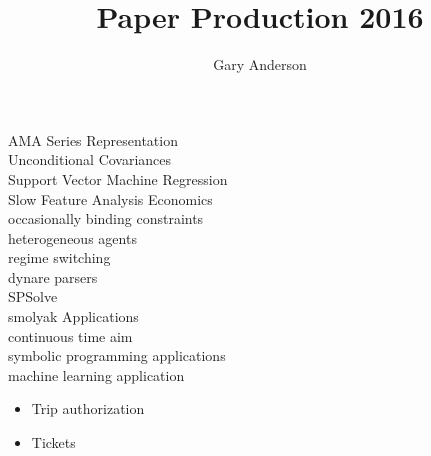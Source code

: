 \documentclass[hyperref]{labbook}
\begin{document}
\frontmatter
\title{Paper Production 2016}
\author{Gary Anderson}
\maketitle

\printindex
\tableofcontents

\mainmatter








\begin{description}
\item[AMA Series Representation] 
\item[Unconditional Covariances]
\item[Support Vector Machine Regression] 
\item[Slow Feature Analysis Economics] 
\item[occasionally binding constraints] 
\item[heterogeneous agents] 
\item[regime switching] 
\item[dynare parsers]
\item[SPSolve] 
\item[smolyak Applications] 
\item[continuous time aim] 
\item[symbolic programming applications] 
\item[machine learning application] 
\end{description}






\begin{itemize}
\item Trip authorization
\item Tickets
\end{itemize}


\end{document}
